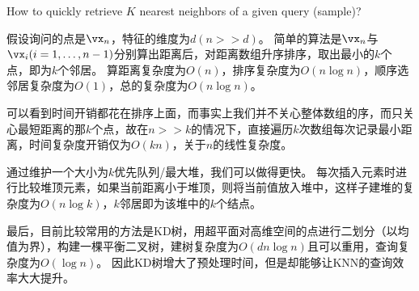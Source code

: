 \documentclass[logo,reportComp]{thesis}
\begin{document}
\begin{question}
\normalfont How to quickly retrieve $K$ nearest neighbors of a given query (sample)?
\end{question}
\begin{answer}
假设询问的点是$\vx_n$，特征的维度为$d(n>>d)$。
简单的算法是$\vx_n$与$\vx_i(i=1,\ldots,n-1)$分别算出距离后，对距离数组升序排序，取出最小的$k$个点，即为$k$个邻居。
算距离复杂度为$O(n)$，排序复杂度为$O(n\log n)$，顺序选邻居复杂度为$O(1)$，总的复杂度为$O(n\log n)$。

可以看到时间开销都花在排序上面，而事实上我们并不关心整体数组的序，而只关心最短距离的那$k$个点，故在$n>>k$的情况下，直接遍历$k$次数组每次记录最小距离，时间复杂度开销仅为$O(kn)$，关于$n$的线性复杂度。

通过维护一个大小为$k$优先队列/最大堆，我们可以做得更快。
每次插入元素时进行比较堆顶元素，如果当前距离小于堆顶，则将当前值放入堆中，这样子建堆的复杂度为$O(n\log k)$，$k$邻居即为该堆中的$k$个结点。

最后，目前比较常用的方法是KD树，用超平面对高维空间的点进行二划分（以均值为界），构建一棵平衡二叉树，建树复杂度为$O(dn\log n)$且可以重用，查询复杂度为$O(\log n)$。
因此KD树增大了预处理时间，但是却能够让KNN的查询效率大大提升。
\end{answer}

\end{document}
